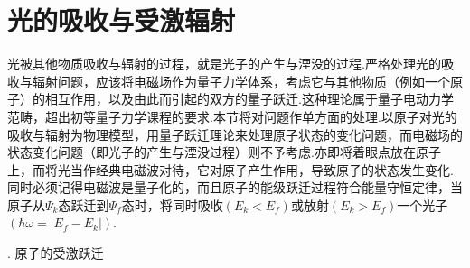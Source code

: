 \section[光的吸收与受激辐射]{光的吸收与受激辐射} \label{sec:09.03} %

光被其他物质吸收与辐射的过程，就是光子的产生与湮没的过程.严格处理光的吸收与辐射问题，应该将电磁场作为量子力学体系，考虑它与其他物质（例如一个原子）的相互作用，以及由此而引起的双方的量子跃迁.这种理论属于量子电动力学范畴，超出初等量子力学课程的要求.本节将对问题作单方面的处理.以原子对光的吸收与辐射为物理模型，用量子跃迁理论来处理原子状态的变化问题，而电磁场的状态变化问题（即光子的产生与湮没过程）则不予考虑.亦即将着眼点放在原子上，而将光当作经典电磁波对待，它对原子产生作用，导致原子的状态发生变化.同时必须记得电磁波是量子化的，而且原子的能级跃迁过程符合能量守恒定律，当原子从$\varPsi_{k}$态跃迁到$\varPsi_{f}$态时，将同时吸收$(E_{k}<E_{f})$或放射$(E_{k}>E_{f})$一个光子$(\hbar\omega=|E_{f}-E_{k}|)$.

{. 原子的受激跃迁}

